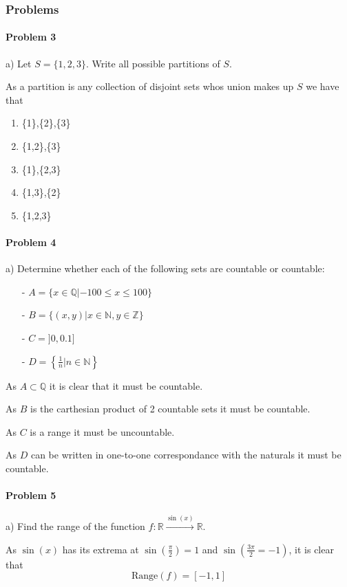 \subsubsection{Problems}
\paragraph{Problem 3}
a) Let $S=\{1,2,3\}$. Write all possible partitions of $S$.

As a partition is any collection of disjoint sets whos union makes up $S$ we have that
\begin{enumerate}
  \item \{1\},\{2\},\{3\}
  \item \{1,2\},\{3\}
  \item \{1\},\{2,3\}
  \item \{1,3\},\{2\}
  \item \{1,2,3\}
\end{enumerate}

\paragraph{Problem 4}
a) Determine whether each of the following sets are countable or countable:
\begin{itemize}
    \item[-] $A=\{x\in \mathbb{Q}|-100\leq x\leq 100\}$
    \item[-] $B=\{(x,y)|x\in \mathbb{N},y \in \mathbb{Z}\}$
    \item[-] $C=]0,0.1]$
    \item[-] $D=\left\{\frac{1}{n}|n\in \mathbb{N}\right\}$
\end{itemize}

As $A\subset \mathbb{Q}$ it is clear that it must be countable.

As $B$ is the carthesian product of 2 countable sets it must be countable.

As $C$ is a range it must be uncountable.

As $D$ can be written in one-to-one correspondance with the naturals it must be countable.

\paragraph{Problem 5}
a) Find the range of the function $f: \mathbb{R} \xrightarrow{\sin(x)} \mathbb{R}$. 

As $\sin(x)$ has its extrema at $\sin\left(\frac{\pi}{2}\right)=1$ and $\sin\left(\frac{3\pi}{2}=-1\right)$, it is clear that
\[
    \text{Range}(f)=[-1,1]
\]
